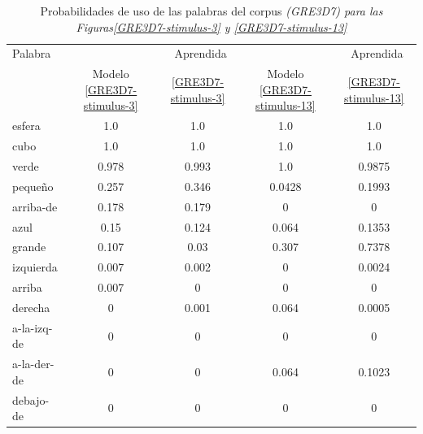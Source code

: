 \begin{table}[h!]
\begin{center}
\begin{tabular}{|l|c|c|c|c|}
\hline
Palabra &  \puse 					& \puse\ Aprendida & \puse\    							& \puse\  Aprendida \\
        & Modelo \ref{GRE3D7-stimulus-3}   & \ref{GRE3D7-stimulus-3} 				& Modelo \ref{GRE3D7-stimulus-13} 			&  \ref{GRE3D7-stimulus-13}  \\
\hline
esfera & 1.0 & 1.0 & 1.0 & 1.0 \\
cubo & 1.0 & 1.0 & 1.0 & 1.0 \\
verde & 0.978 & 0.993 & 1.0 & 0.9875 \\
peque\~no & 0.257 & 0.346 & 0.0428 & 0.1993 \\
arriba-de & 0.178 & 0.179 & 0 & 0\\ 
azul & 0.15 & 0.124 & 0.064 & 0.1353 \\
grande & 0.107 & 0.03 & 0.307 & 0.7378 \\
izquierda & 0.007 & 0.002 & 0 & 0.0024 \\
arriba & 0.007 & 0 & 0 & 0 \\
derecha & 0 & 0.001 & 0.064 & 0.0005 \\
a-la-izq-de & 0 & 0 & 0 & 0 \\
a-la-der-de & 0 & 0 & 0.064 & 0.1023 \\
debajo-de & 0 & 0 & 0 & 0 \\
\hline
\end{tabular}
\caption{Probabilidades de uso de las palabras del corpus \textit{(GRE3D7) para las Figuras\ref{GRE3D7-stimulus-3} y \ref{GRE3D7-stimulus-13} } 
\label{probability-of-use}}
\end{center}
\end{table}


